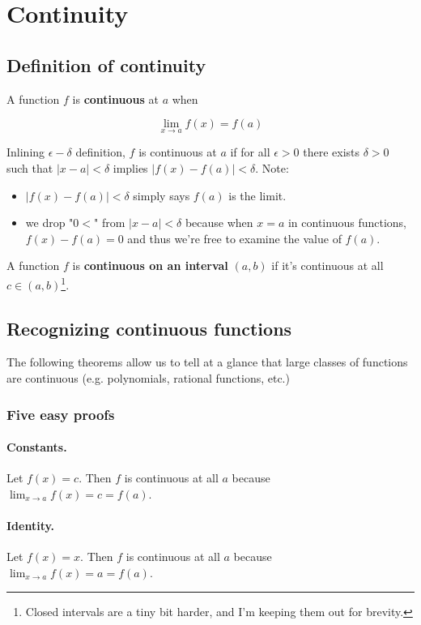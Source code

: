 \section{Continuity}

\subsection{Definition of continuity}

A function $f$ is \textbf{continuous} at $a$ when

\[\lim_{x\to a}f(x)=f(a)\]

Inlining $\epsilon-\delta$ definition, $f$ is continuous at $a$ if for all
$\epsilon>0$ there exists $\delta>0$ such that $|x-a|<\delta$ implies
$|f(x)-f(a)|<\delta$. Note:

\begin{itemize}
    \item $|f(x)-f(a)|<\delta$ simply says $f(a)$ is the limit.
    \item we drop "$0<$" from $|x-a|<\delta$ because when $x=a$ in
      continuous functions, $f(x)-f(a)=0$ and thus we're free to
      examine the value of $f(a)$.
\end{itemize}

A function $f$ is \textbf{continuous on an interval} $(a, b)$ if it's
continuous at all $c\in(a,b)$\footnote{Closed intervals are a tiny bit
  harder, and I'm keeping them out for brevity.}.

\subsection{Recognizing continuous functions}
The following theorems allow us to tell at a glance that large classes
of functions are continuous (e.g. polynomials, rational functions,
etc.)

\subsubsection*{Five easy proofs}

\paragraph{Constants.} Let $f(x)=c$. Then $f$ is continuous at all $a$
because $\lim_{x\to a}f(x)=c=f(a)$.

\vs

\paragraph{Identity.} Let $f(x)=x$. Then $f$ is continuous at all $a$
because $\lim_{x\to a}f(x)=a=f(a)$.

